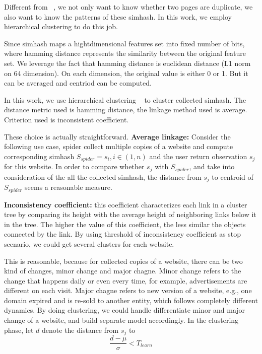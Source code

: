 Different from ~\cite{manku2007detecting}, we not only want to know whether two pages are
duplicate, we also want to know the patterns of these simhash. In this work, we employ
hierarchical clustering to do this job.

Since simhash maps a hightdimensional
features set into fixed number of bits, where hamming distance represents the
similarity between the original feature set. We leverage the fact that hamming
distance is euclidean distance (L1 norm on 64 dimension). On each dimension, the
original value is either 0 or 1. But it can be averaged and centriod can be
computed.

In this work, we use hierarchical clustering ~\cite{jones2014scipy} to cluster
collected simhash. The distance metric used is hamming distance, the linkage
method used is average. Criterion used is inconsistent coefficient.

These choice is actually straightforward. {\bf Average linkage:} 
Consider the following use case, spider collect
multiple copies of a website and compute corresponding simhash $S_{spider} = s_{i}, i \in
(1,n)$ and the user return observation $s_{j}$ for this website. In order to
compare whether $s_{j}$ with $S_{spider}$, and take into consideration of the all the
collected simhash, the distance from $s_{j}$ to centroid of $S_{spider}$ seems a
reasonable measure. 

{\bf Inconsistency coefficient:} this coefficient characterizes each link in a cluster tree by
comparing its height with the average height of neighboring links
below it in the tree. The higher the value of this coefficient, the less similar the
objects connected by the link. By using threshold of inconsistency
coefficient as stop scenario, we could get several clusters for each website.

This is reasonable, because for collected copies of a website, there can be two
kind of changes, minor change and major chagne. Minor change refers to the
change that happens daily or even every time, for example, advertisements are
different on each visit. Major chagne refers to new version of a website, e.g.,
one domain expired and is re-sold to another entity, which follows 
completely different dynamics. By doing clustering, we could handle
differentiate minor and major change of a website, and build separate model
accordingly. In the clustering phase, let $d$ denote the distance from $s_{j}$
to 
\begin{equation}
  \label{coefficient:learn}
  \frac{d - \mu}{\sigma} < T_{learn}
\end{equation}



